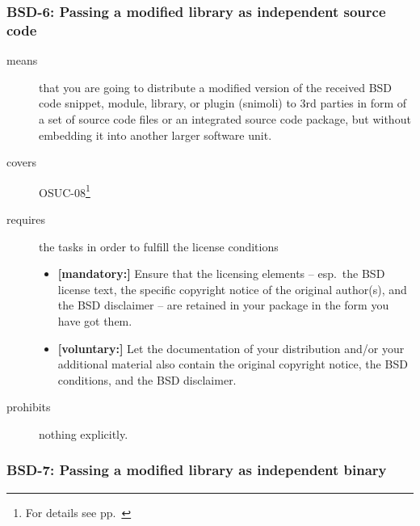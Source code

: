 \subsubsection{BSD-6: Passing a modified library as independent source code}
\label{OSUC-08-BSD}
\begin{description}
\item[means] that you are going to distribute a modified version of the received
BSD code snippet, module, library, or plugin (snimoli) to 3rd parties in form
of a set of source code files or an integrated source code package, but without
embedding it into another larger software unit.
\item[covers] OSUC-08\footnote{For details see pp.\ \pageref{OSUC-08-DEF}}
\item[requires] the tasks in order to fulfill the license conditions
\begin{itemize}
  \item \textbf{[mandatory:]} Ensure that the licensing elements -- esp.\
  the BSD license text, the specific copyright notice of the original author(s),
  and the BSD disclaimer -- are retained in your package in the form you have got
  them.
  \item \textbf{[voluntary:]} Let the documentation of your distribution
  and/or your additional material also contain the original copyright notice, the
  BSD conditions, and the BSD disclaimer.
\end{itemize}
\item[prohibits] nothing explicitly.
\end{description}


\subsubsection{BSD-7: Passing a modified library as independent binary}

